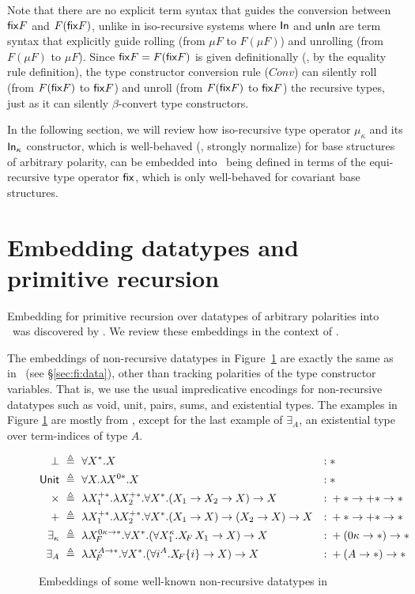Note that there are no explicit term syntax that guides the conversion between
$\mathsf{fix} F$ and $F(\mathsf{fix} F)$, unlike in iso-recursive systems where $\mathsf{In}$ and
$\mathsf{unIn}$ are term syntax that explicitly guide rolling
(from $\mu F$ to $F(\mu F)$) and unrolling (from $F(\mu F)$ to $\mu F$).
Since $\mathsf{fix} F=F(\mathsf{fix} F)$ is given definitionally (\ie, by the equality rule
definition), the type constructor conversion rule ($Conv$) can silently
roll (from $F(\mathsf{fix} F)$ to $\mathsf{fix} F$) and unroll (from $F(\mathsf{fix} F)$ to $\mathsf{fix} F$)
the recursive types, just as it can silently $\beta$-convert type constructors.

In the following section, we will review how iso-recursive type operator
$\mu_\kappa$ and its $\mathsf{In}_\kappa$ constructor, which is well-behaved
(\ie, strongly normalize) for base structures of arbitrary polarity,
can be embedded into \Fixi\ being defined in terms of the equi-recursive
type operator $\mathsf{fix}$, which is only well-behaved for covariant base structures.

\section{Embedding datatypes and primitive recursion}
\label{sec:fixi:data}
Embedding for primitive recursion over datatypes of arbitrary polarities into
\Fixi\ was discovered by \citet{AbeMat04}. We review these embeddings
in the context of \Fixi.

The embeddings of non-recursive datatypes in Figure~\ref{fig:fixiNonRecData}
are exactly the same as in \Fi\ (see \S\ref{sec:fi:data}), other than tracking
polarities of the type constructor variables. That is, we use the usual
impredicative encodings for non-recursive datatypes such as void, unit, pairs,
sums, and existential types. The examples in Figure \ref{fig:fixiNonRecData}
are mostly from \citet{AbeMat04}, except for the last example of $\exists_A$,
an existential type over term-indices of type $A$.
\begin{figure}
\begin{singlespace}
\begin{align*}
\bot &~\triangleq~ \forall X^{*}.X
	&:\;& *\\
\textsf{Unit} &~\triangleq~ \forall X.\lambda X^{0*}. X
	&:\;& * \\
\times &~\triangleq~
	\lambda X_1^{+*}.\lambda X_2^{+*}.\forall X^{*}.(X_1 -> X_2 -> X) -> X
	&:\;& +* -> +* -> * \\
+ &~\triangleq~
	\lambda X_1^{+*}.\lambda X_2^{+*}.\forall X^{*}.(X_1 -> X) -> (X_2 -> X) -> X
	&:\;& +* -> +* -> * \\
\exists_\kappa &~\triangleq~
	\lambda X_{\!F}^{0\kappa -> *}.\forall X^{*}.
		(\forall X_1^\kappa.X_{\!F}\,X_1 -> X) -> X
	&:\;& +(0\kappa -> *) -> * \\
\exists_A &~\triangleq~
	\lambda X_{\!F}^{A -> *}.\forall X^{*}.
	(\forall i^A.X_{\!F}\{i\} -> X) -> X
	&:\;& +(A -> *) -> *
\end{align*}
\caption{Embeddings of some well-known non-recursive datatypes in \Fixi}
\label{fig:fixiNonRecData}
\end{singlespace}
\end{figure}

